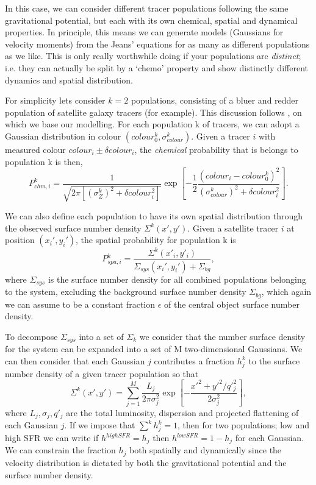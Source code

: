 In this case, we can consider different tracer populations following the same gravitational potential, but each with its own chemical, spatial and dynamical properties. In principle, this means we can generate models (Gaussians for velocity moments) from the Jeans' equations for as many as different populations as we like. This is only really worthwhile doing if your populations are \textit{distinct}; i.e. they can actually be split by a `chemo' property and show distinctly different dynamics and spatial distribution. 

For simplicity lets consider $k=2$ populations, consisting of a bluer and redder population of satellite galaxy tracers (for example). This discussion follows \citet{zhu16sculptor}, on which we base our modelling. For each population k of tracers, we can adopt a Gaussian distribution in colour $(colour^{k}_{0},\sigma^{k}_{colour})$. Given a tracer $i$ with measured colour $colour_i \pm \delta colour_i$, the \textit{chemical} probability that is belongs to population k is then,
\begin{equation}
P_{chm,i}^{k} = \frac{1}{\sqrt{2\pi [(\sigma^{k}_{Z})^2+ \delta colour_{i}^2]}}\exp{\left[-\frac{1}{2}\frac{(colour_{i}-colour^k_0)^2}{(\sigma^k_{colour})^2+\delta colour_i^2}\right]}. 
\end{equation}

We can also define each population to have its own spatial distribution through the observed surface number density $\Sigma^k(x',y')$. Given a satellite tracer $i$ at position $(x_i',y_i')$, the spatial probability for population k is
\begin{equation}
P^{k}_{spa,i} = \frac{\Sigma^k(x'_i,y'_i)}{\Sigma_{sys}(x_i',y_i')+\Sigma_{bg}},
\end{equation}
where $\Sigma_{sys}$ is the surface number density for all combined populations belonging to the system, excluding the background surface number density $\Sigma_{bg}$, which again we can assume to be a constant fraction $\epsilon$ of the central object surface number density. 

To decompose $\Sigma_{sys}$ into a set of $\Sigma_{k}$ we consider that the number surface density for the system can be expanded into a set of M two-dimensional Gaussians. We can then consider that each Gaussian $j$ contributes a fraction $h^{k}_{j}$ to the surface number density of a given tracer population so that
\begin{equation}
\Sigma^{k}(x',y') = \sum^{M}_{j=1} \frac{L_j}{2\pi \sigma^2_j} \exp{\left[-\frac{x'^2 + y'^2 /q'^2_j}{2\sigma^2_j}\right]},
\end{equation}
where $L_j,\sigma_j,q'_j$ are the total luminosity, dispersion and projected flattening of each Gaussian $j$. If we impose that $\sum^k h^k_j = 1$, then for two populations; low and high SFR we can write if $h^{high SFR} = h_j$ then $h^{low SFR} = 1 - h_j$ for each Gaussian. We can constrain the fraction $h_j$ both spatially and dynamically since the velocity distribution is dictated by both the gravitational potential and the surface number density.

